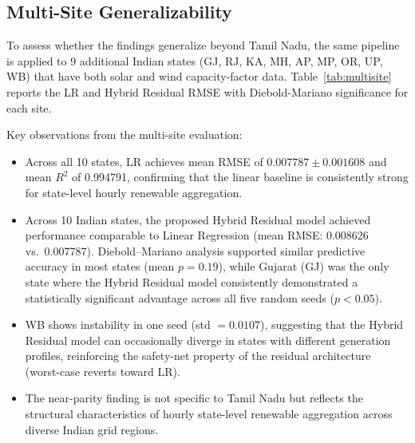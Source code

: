 \documentclass{ieeeaccess}
\begin{document}
\subsection{Multi-Site Generalizability}
To assess whether the findings generalize beyond Tamil Nadu, the same pipeline is applied to 9 additional Indian states (GJ, RJ, KA, MH, AP, MP, OR, UP, WB) that have both solar and wind capacity-factor data. Table~\ref{tab:multisite} reports the LR and Hybrid Residual RMSE with Diebold-Mariano significance for each site.

Key observations from the multi-site evaluation:
\begin{itemize}
\item Across all 10 states, LR achieves mean RMSE of $0.007787 \pm 0.001608$ and mean $R^2$ of 0.994791, confirming that the linear baseline is consistently strong for state-level hourly renewable aggregation.
\item Across 10 Indian states, the proposed Hybrid Residual model achieved performance comparable to Linear Regression (mean RMSE: 0.008626 vs.\ 0.007787). Diebold--Mariano analysis supported similar predictive accuracy in most states (mean $p = 0.19$), while Gujarat (GJ) was the only state where the Hybrid Residual model consistently demonstrated a statistically significant advantage across all five random seeds ($p < 0.05$).
\item WB shows instability in one seed (std $= 0.0107$), suggesting that the Hybrid Residual model can occasionally diverge in states with different generation profiles, reinforcing the safety-net property of the residual architecture (worst-case reverts toward LR).
\item The near-parity finding is not specific to Tamil Nadu but reflects the structural characteristics of hourly state-level renewable aggregation across diverse Indian grid regions.
\end{itemize}
\end{document}
